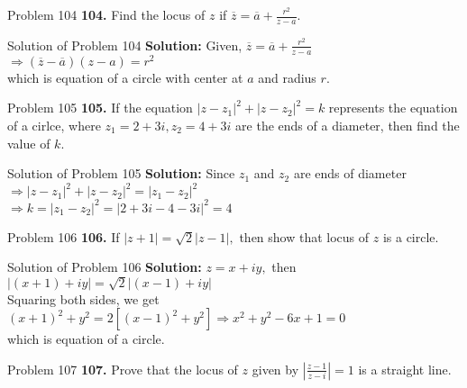 \documentclass[aspectratio=169,8pt]{beamer}
\begin{document}
\begin{frame}{Problem 104}
  \textbf{104.} Find the locus of $z$ if $\overline{z} = \overline{a} + \frac{r^2}{z - a}.$
\end{frame}
\begin{frame}{Solution of Problem 104}
  \textbf{Solution:} Given, $\overline{z} = \overline{a} + \frac{r^2}{z - a}$\\
  \vspace*{0.2cm}
  $\Rightarrow (\overline{z} - \overline{a})(z - a) = r^2$\\
  \vspace*{0.2cm}
  which is equation of a circle with center at $a$ and radius $r.$
\end{frame}
\begin{frame}{Problem 105}
  \textbf{105.} If the equation $|z - z_1|^2 + |z - z_2|^2 = k$ represents the equation of a cirlce, where $z_1 = 2 + 3i, z_2 = 4 +
  3i$ are the ends of a diameter, then find the value of $k.$
\end{frame}
\begin{frame}{Solution of Problem 105}
  \textbf{Solution:} Since $z_1$ and $z_2$ are ends of diameter\\
  \vspace*{0.2cm}
  $\Rightarrow |z - z_1|^2 + |z - z_2|^2 = |z_1 - z_2|^2$\\
  \vspace*{0.2cm}
  $\Rightarrow k = |z_1 - z_2|^2 = |2 + 3i - 4 - 3i|^2 = 4$
\end{frame}
\begin{frame}{Problem 106}
  \textbf{106.} If $|z + 1| = \sqrt{2}|z - 1|,$ then show that locus of $z$ is a circle.
\end{frame}
\begin{frame}{Solution of Problem 106}
  \textbf{Solution:} $z = x + iy,$ then $|(x + 1) + iy| = \sqrt{2}|(x - 1) + iy|$\\
  \vspace*{0.2cm}
  Squaring both sides, we get\\
  \vspace*{0.2cm}
  $(x + 1)^2 + y^2 = 2[(x - 1)^2 + y^2] \Rightarrow x^2 + y^2 - 6x + 1 = 0$\\
  \vspace*{0.2cm}
  which is equation of a circle.
\end{frame}
\begin{frame}{Problem 107}
  \textbf{107.} Prove that the locus of $z$ given by $\left|\frac{z - 1}{z - i}\right| = 1$ is a straight line.
\end{frame}
\end{document}
